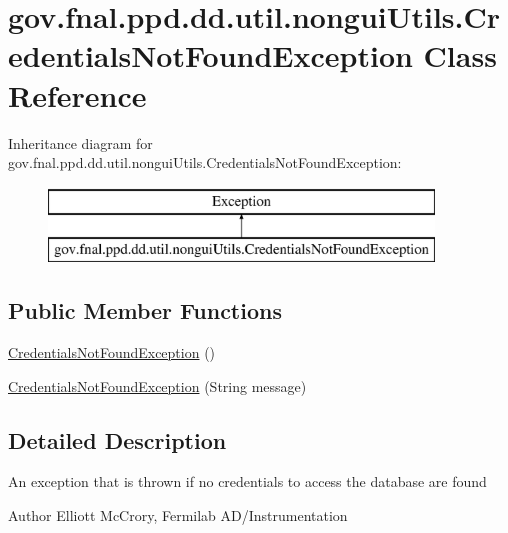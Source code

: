 \hypertarget{classgov_1_1fnal_1_1ppd_1_1dd_1_1util_1_1nonguiUtils_1_1CredentialsNotFoundException}{\section{gov.\-fnal.\-ppd.\-dd.\-util.\-nongui\-Utils.\-Credentials\-Not\-Found\-Exception Class Reference}
\label{classgov_1_1fnal_1_1ppd_1_1dd_1_1util_1_1nonguiUtils_1_1CredentialsNotFoundException}
}
Inheritance diagram for gov.\-fnal.\-ppd.\-dd.\-util.\-nongui\-Utils.\-Credentials\-Not\-Found\-Exception\-:\begin{figure}[H]
\begin{center}
\leavevmode
\includegraphics[height=2.000000cm]{classgov_1_1fnal_1_1ppd_1_1dd_1_1util_1_1nonguiUtils_1_1CredentialsNotFoundException}
\end{center}
\end{figure}
\subsection*{Public Member Functions}
\begin{DoxyCompactItemize}
\item 
\hyperlink{classgov_1_1fnal_1_1ppd_1_1dd_1_1util_1_1nonguiUtils_1_1CredentialsNotFoundException_a24e5cda01ffdd77d365e87dda016d9f7}{Credentials\-Not\-Found\-Exception} ()
\item 
\hyperlink{classgov_1_1fnal_1_1ppd_1_1dd_1_1util_1_1nonguiUtils_1_1CredentialsNotFoundException_a4c697f734502ae8a92024f27512ad032}{Credentials\-Not\-Found\-Exception} (String message)
\end{DoxyCompactItemize}


\subsection{Detailed Description}
An exception that is thrown if no credentials to access the database are found

\begin{DoxyAuthor}{Author}
Elliott Mc\-Crory, Fermilab A\-D/\-Instrumentation 
\end{DoxyAuthor}


